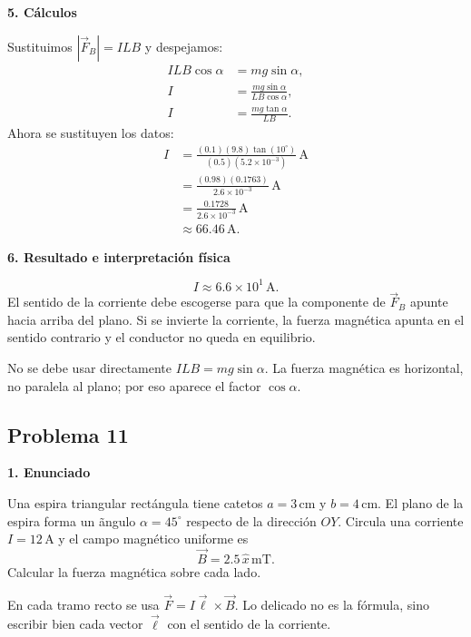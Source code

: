 \documentclass[11pt]{article}
\newcommand{\paso}[1]{%
  \par\medskip
  \noindent\textbf{#1}\par
  \vspace{0.1em}%
}
\begin{document}
\paso{5. C\'alculos}
Sustituimos $|\vec F_B|=ILB$ y despejamos:
\begin{align*}
    ILB\cos\alpha&=mg\sin\alpha,\\
    I&=\frac{mg\sin\alpha}{LB\cos\alpha},\\
    I&=\frac{mg\tan\alpha}{LB}.
\end{align*}
Ahora se sustituyen los datos:
\begin{align*}
    I&=\frac{(0.1)(9.8)\tan(10^\circ)}{(0.5)(5.2\times10^{-3})}\,\mathrm A\\
     &=\frac{(0.98)(0.1763)}{2.6\times10^{-3}}\,\mathrm A\\
     &=\frac{0.1728}{2.6\times10^{-3}}\,\mathrm A\\
     &\approx66.46\,\mathrm A.
\end{align*}

\paso{6. Resultado e interpretaci\'on f\'isica}
\begin{equation*}
    \boxed{I\approx6.6\times10^1\,\mathrm A}.
\end{equation*}
El sentido de la corriente debe escogerse para que la componente de $\vec F_B$ apunte hacia arriba del plano. Si se invierte la corriente, la fuerza magn\'etica apunta en el sentido contrario y el conductor no queda en equilibrio.

\begin{alerta}
No se debe usar directamente $ILB=mg\sin\alpha$. La fuerza magn\'etica es horizontal, no paralela al plano; por eso aparece el factor $\cos\alpha$.
\end{alerta}

\newpage

\subsection*{Problema 11}
\paso{1. Enunciado}
Una espira triangular rect\'angula tiene catetos $a=3\,\mathrm{cm}$ y $b=4\,\mathrm{cm}$. El plano de la espira forma un \~angulo $\alpha=45^\circ$ respecto de la direcci\'on $OY$. Circula una corriente $I=12\,\mathrm A$ y el campo magn\'etico uniforme es
\begin{equation*}
    \vec B=2.5\,\hat x\,\mathrm{mT}.
\end{equation*}
Calcular la fuerza magn\'etica sobre cada lado.

\begin{comentario}
En cada tramo recto se usa $\vec F=I\vec\ell\times\vec B$. Lo delicado no es la f\'ormula, sino escribir bien cada vector $\vec\ell$ con el sentido de la corriente.
\end{comentario}
\end{document}
